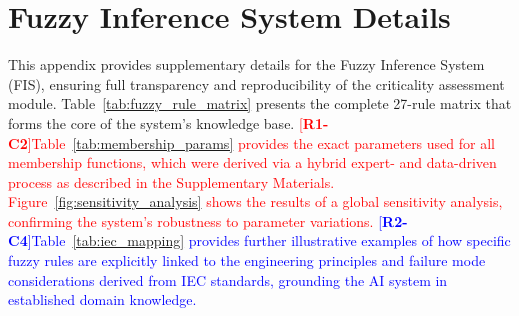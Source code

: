 \documentclass[energies,article,submit,pdftex,moreauthors]{Definitions/mdpi}
\newcommand{\revtag}[2]{[\textbf{R#1-C#2}]}
\newcommand{\Rone}[1]{\textcolor{red}{#1}}
\newcommand{\Rtwo}[1]{\textcolor{blue}{#1}}
\begin{document}
\section{Fuzzy Inference System Details}\label{sec:appendix_a}
This appendix provides supplementary details for the Fuzzy Inference System (FIS), ensuring full transparency and reproducibility of the criticality assessment module. Table~\ref{tab:fuzzy_rule_matrix} presents the complete 27-rule matrix that forms the core of the system's knowledge base. \Rone{\revtag{1}{2}Table~\ref{tab:membership_params} provides the exact parameters used for all membership functions, which were derived via a hybrid expert- and data-driven process as described in the Supplementary Materials. Figure~\ref{fig:sensitivity_analysis} shows the results of a global sensitivity analysis, confirming the system's robustness to parameter variations.} \Rtwo{\revtag{2}{4}Table~\ref{tab:iec_mapping} provides further illustrative examples of how specific fuzzy rules are explicitly linked to the engineering principles and failure mode considerations derived from IEC standards, grounding the AI system in established domain knowledge.}
\end{document}
